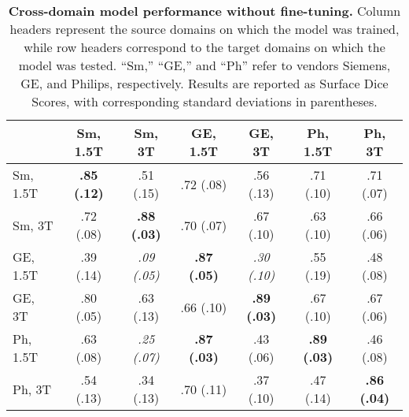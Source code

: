 


\begin{table}[h!]
	\centering
	\caption{\textbf{Cross-domain model performance without fine-tuning.} Column headers represent the source domains on which the model was trained, while row headers correspond to the target domains on which the model was tested. ``Sm,'' ``GE,'' and ``Ph'' refer to vendors Siemens, GE, and Philips, respectively. Results are reported as Surface Dice Scores, with corresponding standard deviations in parentheses.}
	\label{tab:mri_baseline}
	
	\begin{tabular}{lcccccc}
		\toprule
		& Sm, 1.5T & Sm, 3T & GE, 1.5T & GE, 3T & Ph, 1.5T & Ph, 3T \\
		\midrule
		Sm, 1.5T & \textbf{.85 (.12)} & .51 (.15) & .72 (.08) & .56 (.13) & .71 (.10) & .71 (.07) \\
		
		Sm, 3T   & .72 (.08) & \textbf{.88 (.03)} & .70 (.07) & .67 (.10) & .63 (.10) & .66 (.06) \\
		
		GE, 1.5T & .39 (.14) & \textit{.09 (.05)} & \textbf{.87 (.05)} & \textit{.30 (.10)} & .55 (.19) & .48 (.08) \\
		
		GE, 3T   & .80 (.05) & .63 (.13) & .66 (.10) & \textbf{.89 (.03)} & .67 (.10) & .67 (.06) \\
		
		Ph, 1.5T & .63 (.08) & \textit{.25 (.07)} & \textbf{.87 (.03)} & .43 (.06) & \textbf{.89 (.03)} & .46 (.08) \\
		
		Ph, 3T   & .54 (.13) & .34 (.13) & .70 (.11) & .37 (.10) & .47 (.14) &  \textbf{.86 (.04)} \\
		\bottomrule
	\end{tabular}
\end{table}
